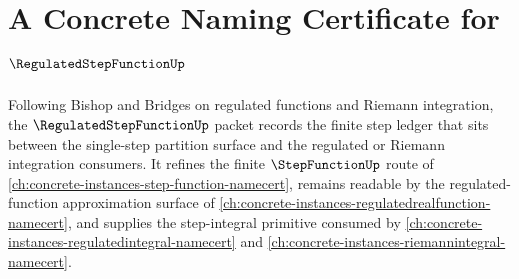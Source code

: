 \chapter{A Concrete Naming Certificate for $\RegulatedStepFunctionUp$}
\label{ch:concrete-instances-regulated-step-function-namecert}

Following Bishop and Bridges on regulated functions and Riemann integration, the $\RegulatedStepFunctionUp$ packet records the finite step ledger that sits between the single-step partition surface and the regulated or Riemann integration consumers. It refines the finite $\StepFunctionUp$ route of \autoref{ch:concrete-instances-step-function-namecert}, remains readable by the regulated-function approximation surface of \autoref{ch:concrete-instances-regulatedrealfunction-namecert}, and supplies the step-integral primitive consumed by \autoref{ch:concrete-instances-regulatedintegral-namecert} and \autoref{ch:concrete-instances-riemannintegral-namecert}.

